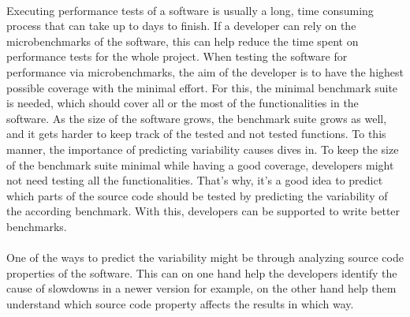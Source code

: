 \documentclass{seal_thesis}
\begin{document}
\\
Executing performance tests of a software is usually a long, time consuming process that can take up to days to finish. If a developer can rely on the microbenchmarks of the software, this can help reduce the time spent on performance tests for the whole project. When testing the software for performance via microbenchmarks, the aim of the developer is to have the highest possible coverage  with the minimal effort. For this, the minimal benchmark suite is needed, which should cover all or the most of the functionalities in the software. As the size of the software grows, the benchmark suite grows as well, and it gets harder to keep track of the tested and not tested functions. To this manner, the importance of predicting variability causes dives in. To keep the size of the benchmark suite minimal while having a good coverage, developers might not need testing all the functionalities. That's why, it's a good idea to predict which parts of the source code should be tested by predicting the variability of the according benchmark. With this, developers can be supported to write better benchmarks.\\
\\
One of the ways to predict the variability might be through analyzing source code properties of the software. This can on one hand help the developers identify the cause of slowdowns in a newer version for example, on the other hand help them understand which source code property affects the
results in which way.\\
\\
\end{document}
